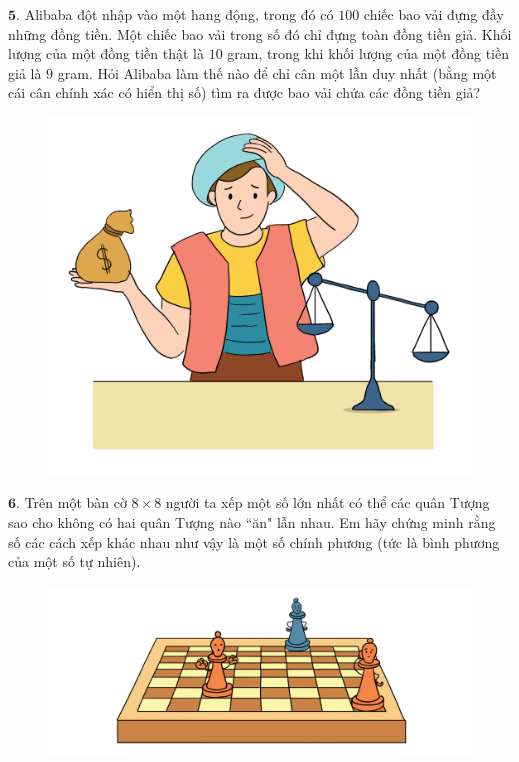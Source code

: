 \begin{multicols}{2}
\begin{figure}[H]
		\vspace*{-10pt}
	\end{figure}
	$\pmb{5.}$ Alibaba đột nhập vào một hang động, trong đó có $100$ chiếc bao vải đựng đầy những đồng tiền. Một chiếc bao vải trong số đó chỉ đựng toàn đồng tiền giả. Khối lượng của một đồng tiền thật là $10$ gram, trong khi khối lượng của một đồng tiền giả là $9$ gram. Hỏi Alibaba làm thế nào để chỉ cân một lần duy nhất (bằng một cái cân chính xác có hiển thị số) tìm ra được bao vải chứa các đồng tiền giả?
	\begin{figure}[H]
		\centering
		\vspace*{-5pt}
		\captionsetup{labelformat= empty, justification=centering}
		\includegraphics[width=1\linewidth]{Pi6_bai5}
		\vspace*{-10pt}
	\end{figure}
	$\pmb{6.}$ 	Trên một bàn cờ $8\times8$ người ta xếp một số lớn nhất có thể các quân Tượng sao cho không có hai quân Tượng nào ``ăn" lẫn nhau. Em hãy chứng minh rằng số các cách xếp khác nhau như vậy là một số chính phương (tức là bình phương của một số tự nhiên).
	\begin{figure}[H]
		\centering
		\vspace*{-5pt}
		\captionsetup{labelformat= empty, justification=centering}
		\includegraphics[width=1\linewidth]{Pi6_bai6}
		\vspace*{-5pt}
	\end{figure}
\end{multicols}
